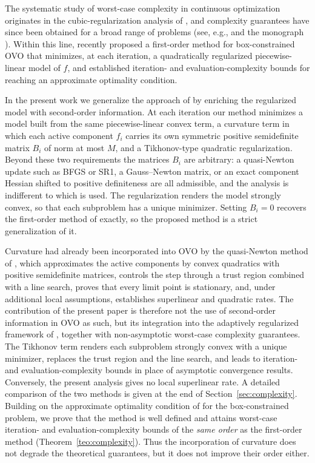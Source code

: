 \documentclass[11pt]{article}
\begin{document}
The systematic study of worst-case complexity in continuous optimization
originates in the cubic-regularization analysis of \cite{nesterov}, and
complexity guarantees have since been obtained for a broad range of problems
(see, e.g., \cite{bgmst2,bgmst1} and the monograph \cite{cogtbook}). Within
this line, \cite{alvarezovo} recently proposed a first-order method for
box-constrained OVO that minimizes, at each iteration, a quadratically
regularized piecewise-linear model of $f$, and established iteration- and
evaluation-complexity bounds for reaching an approximate optimality condition.

In the present work we generalize the approach of \cite{alvarezovo} by
enriching the regularized model with second-order information. At each
iteration our method minimizes a model built from the same piecewise-linear
convex term, a curvature term in which each active component $f_i$ carries its
own symmetric positive semidefinite matrix $B_i$ of norm at most $M$, and a
Tikhonov-type quadratic regularization. Beyond these two requirements the
matrices $B_i$ are arbitrary: a quasi-Newton update such as BFGS or SR1, a
Gauss--Newton matrix, or an exact component Hessian shifted to positive
definiteness are all admissible, and the analysis is indifferent to which is
used. The regularization renders the model strongly convex, so that each
subproblem has a unique minimizer. Setting $B_i=0$ recovers the
first-order method of \cite{alvarezovo} exactly, so the proposed method is a
strict generalization of it.

Curvature had already been incorporated into OVO by the quasi-Newton method of
\cite{yano1}, which approximates the active components by convex quadratics
with positive semidefinite matrices, controls the step through a trust region
combined with a line search, proves that every limit point is stationary, and,
under additional local assumptions, establishes superlinear and quadratic
rates. The contribution of the present paper is therefore not the use of
second-order information in OVO as such, but its integration into the
adaptively regularized framework of \cite{alvarezovo}, together with
non-asymptotic worst-case complexity guarantees. The Tikhonov term renders each
subproblem strongly convex with a unique minimizer, replaces the trust region
and the line search, and leads to iteration- and evaluation-complexity bounds
in place of asymptotic convergence results. Conversely, the present analysis
gives no local superlinear rate. A detailed comparison of the two methods is
given at the end of Section~\ref{sec:complexity}.
Building on the approximate optimality
condition of \cite{alvarezovo} for
the box-constrained problem, we prove that the method is well defined and
attains worst-case iteration- and evaluation-complexity bounds of the
\emph{same order} as the first-order method (Theorem~\ref{teo:complexity}). Thus the incorporation of curvature does not degrade
the theoretical guarantees, but it does not improve their order either.
\end{document}
